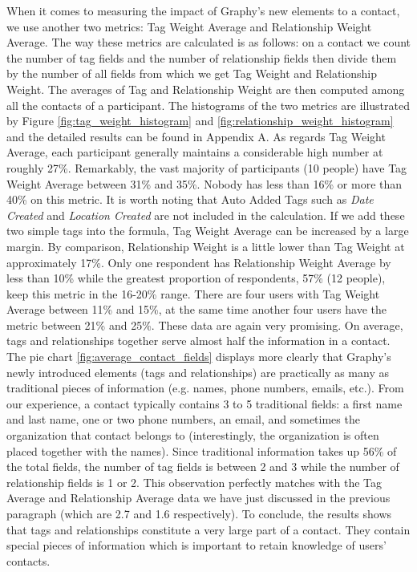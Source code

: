 When it comes to measuring the impact of Graphy's new elements to a contact, we use another two metrics: Tag Weight Average and Relationship Weight Average. The way these metrics are calculated is as follows: on a contact we count the number of tag fields and the number of relationship fields then divide them by the number of all fields from which we get Tag Weight and Relationship Weight. The averages of Tag and Relationship Weight are then computed among all the contacts of a participant. The histograms of the two metrics are illustrated by Figure \ref{fig:tag_weight_histogram} and \ref{fig:relationship_weight_histogram} and the detailed results can be found in Appendix A. As regards Tag Weight Average, each participant generally maintains a considerable high number at roughly 27\%. Remarkably, the vast majority of participants (10 people) have Tag Weight Average between 31\% and 35\%. Nobody has less than 16\% or more than 40\% on this metric. It is worth noting that Auto Added Tags such as \textit{Date Created} and \textit{Location Created} are not included in the calculation. If we add these two simple tags into the formula, Tag Weight Average can be increased by a large margin. By comparison, Relationship Weight is a little lower than Tag Weight at approximately 17\%. Only one respondent has Relationship Weight Average by less than 10\% while the greatest proportion of respondents, 57\% (12 people), keep this metric in the 16-20\% range. There are four users with Tag Weight Average between 11\% and 15\%, at the same time another four users have the metric between 21\% and 25\%. These data are again very promising. On average, tags and relationships together serve almost half the information in a contact. The pie chart \ref{fig:average_contact_fields} displays more clearly that Graphy's newly introduced elements (tags and relationships) are practically as many as traditional pieces of information (e.g. names, phone numbers, emails, etc.). From our experience, a contact typically contains 3 to 5 traditional fields: a first name and last name, one or two phone numbers, an email, and sometimes the organization that contact belongs to (interestingly, the organization is often placed together with the names). Since traditional information takes up 56\% of the total fields, the number of tag fields is between 2 and 3 while the number of relationship fields is 1 or 2. This observation perfectly matches with the Tag Average and Relationship Average data we have just discussed in the previous paragraph (which are 2.7 and 1.6 respectively). To conclude, the results shows that tags and relationships constitute a very large part of a contact. They contain special pieces of information which is important to retain knowledge of users' contacts.

